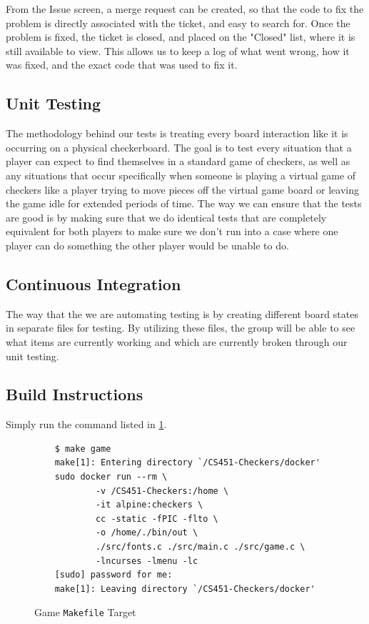 \documentclass[letterpaper]{article}
\begin{document}
From the Issue screen, a merge request can be created, so that 
the code to fix the problem is directly associated with the 
ticket, and easy to search for. Once the problem is fixed, the 
ticket is closed, and placed on the "Closed" list, where it is 
still available to view. This allows us to keep a log of what 
went wrong, how it was fixed, and the exact code that was used 
to fix it.

\subsection{Unit Testing}
\label{sec:policies_units}

The methodology behind our tests is treating every board
interaction like it is occurring on a physical checkerboard. The
goal is to test every situation that a player can expect to find
themselves in a standard game of checkers, as well as any
situations that occur specifically when someone is playing a
virtual game of checkers like a player trying to move pieces off
the virtual game board or leaving the game idle for extended
periods of time. The way we can ensure that the tests are good
is by making sure that we do identical tests that are completely
equivalent for both players to make sure we don't run into a
case where one player can do something the other player would be
unable to do. 

\subsection{Continuous Integration}
\label{sec:policies_integration}

The way that the we are automating testing is by creating
different board states in separate files for testing. By
utilizing these files, the group will be able to see what items
are currently working and  which are currently broken through
our unit testing. 

\subsection{Build Instructions}
\label{sec:policies_building}

Simply run the command listed in
\cref{fig:policies_building_game}.

\lstset{basicstyle=\ttfamily}
\lstset{frame=tb,showstringspaces=false}
\begin{figure}
    \begin{lstlisting}
    $ make game
    make[1]: Entering directory `/CS451-Checkers/docker'
    sudo docker run --rm \
            -v /CS451-Checkers:/home \
            -it alpine:checkers \
            cc -static -fPIC -flto \
            -o /home/./bin/out \
            ./src/fonts.c ./src/main.c ./src/game.c \
            -lncurses -lmenu -lc
    [sudo] password for me:
    make[1]: Leaving directory `/CS451-Checkers/docker'
    \end{lstlisting}
    \caption{Game \texttt{Makefile} Target}
    \label{fig:policies_building_game}
\end{figure}
\end{document}
